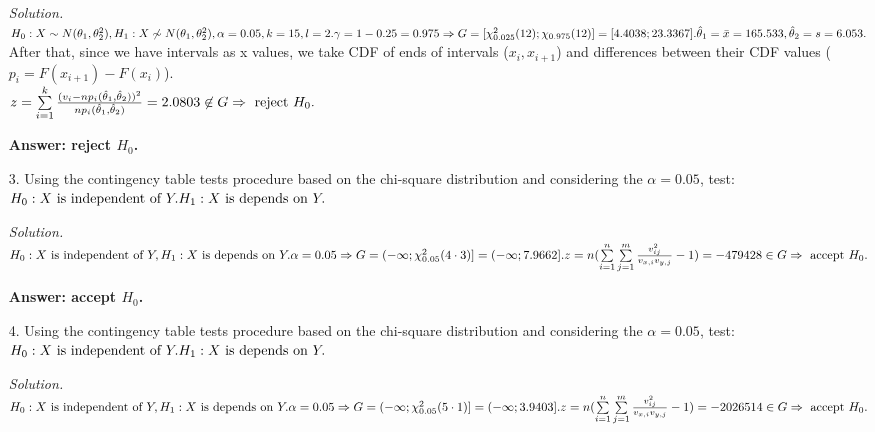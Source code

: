 \documentclass[12pt]{article}
\begin{document}
\begin{itemize}
\textit{Solution.} $H_0 : X\sim N(\theta_1, \theta_2^2), H_1 : X\not\sim N(\theta_1, \theta_2^2), \alpha = 0.05, k = 15, \\
l = 2. \\
\gamma = 1 - 0.25 = 0.975 \Rightarrow G = [\chi_{0.025}^2(12); \chi_{0.975}(12)] = [4.4038; 23.3367]. \\
\hat\theta_1 = \bar{x} = 165.533, \hat\theta_2 = s = 6.053. \\
$
After that, since we have intervals as x values, we take CDF of ends of intervals ($x_i, x_{i+1}$) and differences between their CDF values ($p_i = F(x_{i+1}) - F(x_i)$). \\
$z = \sum\limits_{i=1}^{k}\frac{(v_i - np_i(\hat\theta_1, \hat\theta_2))^2}{np_i(\hat\theta_1, \hat\theta_2)} = 2.0803 \not\in G \Rightarrow \text{ reject } H_0. \\
$

\textbf{Answer: reject $H_0$.}

\item[3.]
Using the contingency table tests procedure based on the chi-square distribution and considering the $\alpha = 0.05$, test: \\
$H_0 : X\text{ is independent of }Y. \\
H_1 : X\text{ is depends on }Y. \\
$

\textit{Solution.} $H_0 : X\text{ is independent of }Y, H_1 : X\text{ is depends on }Y. \\
\alpha = 0.05 \Rightarrow G = (-\infty; \chi_{0.05}^2(4\cdot 3)] = (-\infty; 7.9662]. \\
z = n(\sum\limits_{i=1}^n\sum\limits_{j=1}^m \frac{v_{ij}^2}{v_{x,i}v_{y,j}} - 1) = -479428 \in G \Rightarrow \text{ accept } H_0. \\
$

\textbf{Answer: accept $H_0$.}

\item[4.]
Using the contingency table tests procedure based on the chi-square distribution and considering the $\alpha = 0.05$, test: \\
$H_0 : X\text{ is independent of }Y. \\
H_1 : X\text{ is depends on }Y. \\
$

\textit{Solution.} $H_0 : X\text{ is independent of }Y, H_1 : X\text{ is depends on }Y. \\
\alpha = 0.05 \Rightarrow G = (-\infty; \chi_{0.05}^2(5\cdot 1)] = (-\infty; 3.9403]. \\
z = n(\sum\limits_{i=1}^n\sum\limits_{j=1}^m \frac{v_{ij}^2}{v_{x,i}v_{y,j}} - 1) = -2026514 \in G \Rightarrow \text{ accept } H_0. \\
$


\end{itemize}
\end{document}
